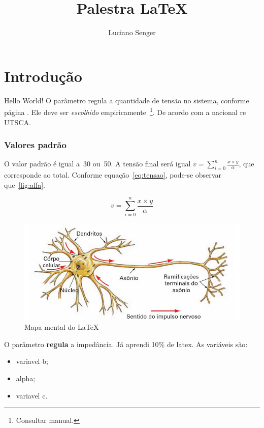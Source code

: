 \documentclass[a4paper, brazil, 12pt , onecolumn]{report}
\title{Palestra \LaTeX}
\author{Luciano Senger}
\begin{document}
	\maketitle
	\tableofcontents
	\listoffigures
	\listoftables
\chapter{Introdução}

Hello World!
O parâmetro  regula a quantidade de tensão no sistema, conforme página \pageref{sec:mat}.
Ele deve ser \textit{escolhido} empiricamente~\footnote{Consultar manual.}.
De acordo com a nacional re \mbox{UTSCA}. 
\subsection{Valores padrão}
O valor padrão é igual a~30 ou~50.
A tensão final será igual $v = \sum_{i=0}^n \frac{x \times y}{\alpha}$, que corresponde ao total.
Conforme equação~\ref{eq:tensao}, pode-se observar que~\ref{fig:alfa}.

\begin{equation}
	v = \sum_{i=0}^n \frac{x \times y}{\alpha}
\end{equation}\label{eq:tensao}

\begin{figure}[htb]
	\centering
	\includegraphics[scale=.1]{neuronio}
	\caption{Mapa mental do \LaTeX}
\end{figure}\label{fig:alfa}

O parâmetro {\Huge {}} \textbf{regula} a impedância.
Já aprendi 10\% de latex.
As variáveis são:
\begin{itemize}
	\item variavel b;
	\item alpha;
	\item variavel c.
\end{itemize}
\end{document}
